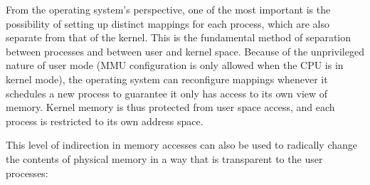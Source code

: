 From the operating system's perspective, one of the most important is the
possibility of setting up distinct mappings for each process, which are also
separate from that of the kernel.  This is the fundamental method of separation
between processes and between user and kernel space.  Because of the
unprivileged nature of user mode (MMU configuration is only allowed when the CPU
is in kernel mode), the operating system can reconfigure mappings whenever it
schedules a new process to guarantee it only has access to its own view of
memory.  Kernel memory is thus protected from user space access, and each
process is restricted to its own address space\footnotemark.


This level of indirection in memory accesses can also be used to radically
change the contents of physical memory in a way that is transparent to the user
processes:

